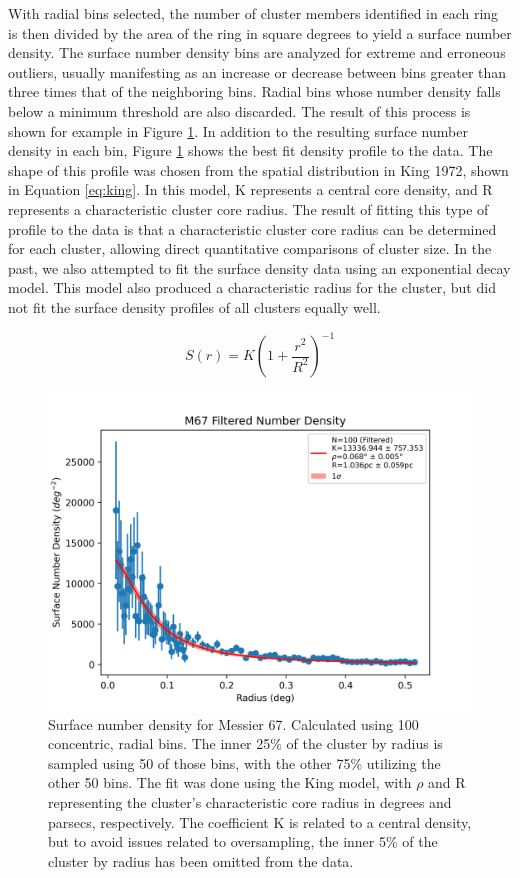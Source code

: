 \documentclass[onecolumn,table,xcdraw,super]{aastex631}
\newcommand{\beq}{\begin{equation}}
\newcommand{\eeq}{\end{equation}}
\begin{document}
With radial bins selected, the number of cluster members identified in each ring is then divided by the area of the ring in square degrees to yield a surface number density. The surface number density bins are analyzed for extreme and erroneous outliers, usually manifesting as an increase or decrease between bins greater than three times that of the neighboring bins. Radial bins whose number density falls below a minimum threshold are also discarded. The result of this process is shown for example in Figure \ref{fig:M67_num_density}. In addition to the resulting surface number density in each bin, Figure \ref{fig:M67_num_density} shows the best fit density profile to the data. The shape of this profile was chosen from the spatial distribution in King 1972, shown in Equation \ref{eq:king}. In this model, K represents a central core density, and R represents a characteristic cluster core radius. The result of fitting this type of profile to the data is that a characteristic cluster core radius can be determined for each cluster, allowing direct quantitative comparisons of cluster size. In the past, we also attempted to fit the surface density data using an exponential decay model. This model also produced a characteristic radius for the cluster, but did not fit the surface density profiles of all clusters equally well.

\beq
\label{eq:king}
S\left(r\right) = K\left(1+\frac{r^2}{R^2}\right)^{-1}
\eeq

\begin{figure}[]
    \centering
      \includegraphics[width=4.75in]{figures/M67_numDensity_filtered.png}
    \caption{Surface number density for Messier 67. Calculated using 100 concentric, radial bins. The inner 25\% of the cluster by radius is sampled using 50 of those bins, with the other 75\% utilizing the other 50 bins. The fit was done using the King model, with $\rho$ and R representing the cluster's characteristic core radius in degrees and parsecs, respectively. The coefficient K is related to a central density, but to avoid issues related to oversampling, the inner 5\% of the cluster by radius has been omitted from the data.}
    \label{fig:M67_num_density}
\end{figure}
\end{document}
